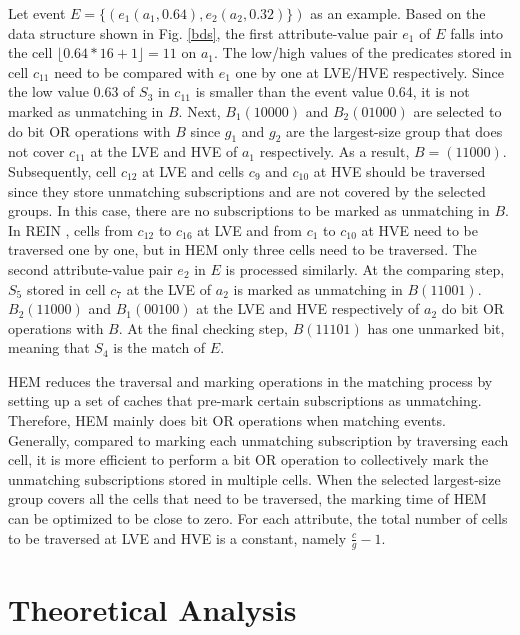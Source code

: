 \documentclass[runningheads]{llncs}
\begin{document}
Let event $E=\{(e_1(a_1, 0.64), e_2(a_2, 0.32)\})$ as an example. Based on the data structure shown in Fig. \ref{bds}, the first attribute-value pair $e_1$ of $E$ falls into the cell $\lfloor0.64*16+1\rfloor=11$ on $a_1$.
The low/high values of the predicates stored in cell $c_{11}$ need to be compared with $e_1$ one by one at LVE/HVE respectively. Since the low value 0.63 of $S_3$ in $c_{11}$ is smaller than the event value 0.64, it is not marked as unmatching in $B$. 
Next, $B_1 (10000)$ and $B_2 (01000)$ are selected to do bit OR operations with $B$ since $g_1$ and $g_2$ are the largest-size group that does not cover $c_{11}$ at the LVE and HVE of $a_1$ respectively. As a result, $B = (11000)$. 
Subsequently, cell $c_{12}$ at LVE and cells $c_9$ and $c_{10}$ at HVE should be traversed since they store unmatching subscriptions and are not covered by the selected groups. In this case, there are no subscriptions to be marked as unmatching in $B$. %
In REIN \cite{REIN}, cells from $c_{12}$ to $c_{16}$ at LVE and from $c_1$ to $c_{10}$ at HVE need to be traversed one by one,  %
but in HEM only three cells need to be traversed. %
The second attribute-value pair $e_2$ in $E$ is processed similarly. At the comparing step, $S_5$ stored in cell $c_7$ at the LVE of $a_2$ is marked as unmatching in $B(11001)$. $B_2 (11000)$ and $B_1 (00100)$ at the LVE and HVE respectively of $a_2$ do bit OR operations with $B$. 
At the final checking step, $B (11101)$ has one unmarked bit, meaning that $S_4$ is the match of $E$. 

HEM reduces the traversal and marking operations in the matching process by setting up a set of caches that pre-mark certain subscriptions as unmatching. Therefore, HEM mainly does bit OR operations when matching events. Generally,  compared to marking each unmatching subscription by traversing each cell, it is more efficient to perform a bit OR operation to collectively mark the unmatching subscriptions stored in multiple cells. When the selected largest-size group covers all the cells that need to be traversed, the marking time of HEM can be optimized to be close to zero. For each attribute, the total number of cells to be traversed at LVE and HVE is a constant, namely $\frac{c}{g}-1$.



\section{Theoretical Analysis}
\label{ta}
\end{document}
